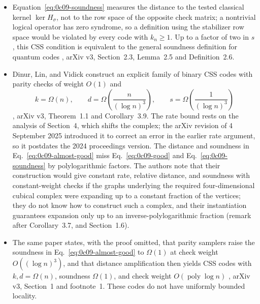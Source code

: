 \begin{itemize}
  \item Equation~\eqref{eq:0c09-soundness} measures the distance to the tested
classical kernel $\ker H_\sigma$, not to the row space of the opposite check
matrix; a nontrivial logical operator has zero syndrome, so a definition using
the stabilizer row space would be violated by every code with $k_n\ge1$.  Up
to a factor of two in $s$, this CSS condition is equivalent to the general
soundness definition for quantum codes
, arXiv v3, Section~2.3, Lemma~2.5 and
Definition~2.6.

  \item Dinur, Lin, and Vidick construct an explicit family of binary CSS codes
with parity checks of weight $O(1)$ and
\begin{equation}
  k=\Omega(n),\qquad
  d=\Omega\!\left(\frac{n}{(\log n)^3}\right),\qquad
  s=\Omega\!\left(\frac{1}{(\log n)^3}\right)
  \label{eq:0c09-almost-good}
\end{equation}
, arXiv v3, Theorem~1.1 and Corollary~3.9.
The rate bound rests on the analysis of Section~4, which shifts the complex;
the arXiv revision of 4 September 2025 introduced it to correct an error in
the earlier rate argument, so it postdates the 2024 proceedings version.  The
distance and soundness in
Eq.~\eqref{eq:0c09-almost-good} miss Eq.~\eqref{eq:0c09-good} and
Eq.~\eqref{eq:0c09-soundness} by polylogarithmic factors.  The authors note
that their construction would give constant rate, relative distance, and
soundness with constant-weight checks if the graphs underlying the required
four-dimensional cubical complex were expanding up to a constant fraction of
the vertices; they do not know how to construct such a complex, and their
instantiation guarantees expansion only up to an inverse-polylogarithmic
fraction (remark after Corollary~3.7, and Section~1.6).

  \item The same paper states, with the proof omitted, that parity samplers raise
the soundness in Eq.~\eqref{eq:0c09-almost-good} to $\Omega(1)$ at check
weight $O((\log n)^3)$, and that distance amplification then yields CSS codes
with $k,d=\Omega(n)$, soundness $\Omega(1)$, and check weight
$O(\operatorname{poly}\log n)$ , arXiv v3,
Section~1 and footnote~1.  These codes do not have uniformly bounded
locality.


\end{itemize}
